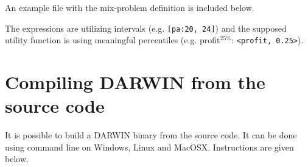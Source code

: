 An example file with the mix-problem definition is included below.



The expressions are utilizing intervals (e.g. \texttt{[pa:20, 24]}) and the
supposed utility function is using meaningful percentiles
(e.g. profit$^{25\%}$: \texttt{<profit, 0.25>}).



\chapter{Compiling DARWIN from the source code}

It is possible to build a DARWIN binary from the source code. It can be done
using command line on Windows, Linux and MacOSX.  Instructions are given
below.

